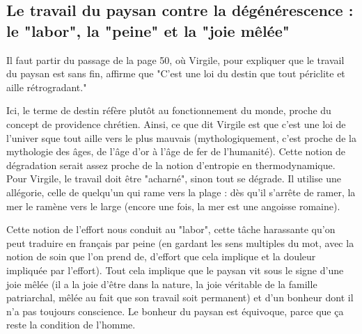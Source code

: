 \documentclass[a4paper,12pt]{book}
\begin{document}
\subsection{Le travail du paysan contre la dégénérescence : le "labor", la "peine" et la "joie mêlée"}
Il faut partir du passage de la page 50, où Virgile, pour expliquer que le travail du paysan est sans fin, affirme que "C'est une loi du destin que tout périclite et aille rétrogradant."
\par Ici, le terme de destin réfère plutôt au fonctionnement du monde, proche du concept de providence chrétien. Ainsi, ce que dit Virgile est que c'est une loi de l'univer sque tout aille vers le plus mauvais (mythologiquement, c'est proche de la mythologie des âges, de l'âge d'or à l'âge de fer de l'humanité). Cette notion de dégradation serait assez proche de la notion d'entropie en thermodynamique. Pour Virgile, le travail doit être "acharné", sinon tout se dégrade. Il utilise une allégorie, celle de quelqu'un qui rame vers la plage : dès qu'il s'arrête de ramer, la mer le ramène vers le large (encore une fois, la mer est une angoisse romaine).
\par Cette notion de l'effort nous conduit au "labor", cette tâche harassante qu'on peut traduire en français par peine (en gardant les sens multiples du mot, avec la notion de soin que l'on prend de, d'effort que cela implique et la douleur impliquée par l'effort). Tout cela implique que le paysan vit sous le signe d'une joie mêlée (il a la joie d'être dans la nature, la joie véritable de la famille patriarchal, mêlée au fait que son travail soit permanent) et d'un bonheur dont il n'a pas toujours conscience. Le bonheur du paysan est équivoque, parce que ça reste la condition de l'homme.
\end{document}
